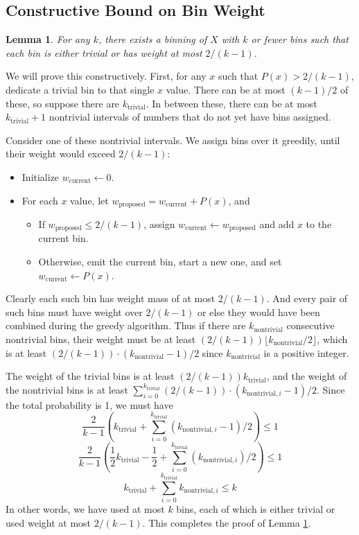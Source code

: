 \documentclass[letterpaper]{article}
\newtheorem{lemma}{Lemma}
\begin{document}
\subsection{Constructive Bound on Bin Weight}

\begin{lemma}
  For any $k$, there exists a binning of $X$ with $k$ or fewer bins such that each bin is either trivial or has weight at most $2/(k - 1)$.
  \label{lemma:binning_construction}
\end{lemma}

We will prove this constructively.
First, for any $x$ such that $P(x) > 2/(k - 1)$, dedicate a trivial bin to that single $x$ value.
There can be at most $(k - 1)/2$ of these, so suppose there are $k_\text{trivial}$.
In between these, there can be at most $k_\text{trivial} + 1$ nontrivial intervals of numbers that do not yet have bins assigned.

Consider one of these nontrivial intervals.
We assign bins over it greedily, until their weight would exceed $2/(k - 1)$:
\begin{itemize}
  \item Initialize $w_\text{current} \gets 0$.
  \item For each $x$ value, let $w_\text{proposed} = w_\text{current} + P(x)$, and
    \begin{itemize}
      \item If $w_\text{proposed} \le 2/(k - 1)$, assign $w_\text{current} \gets w_\text{proposed}$ and add $x$ to the current bin.
      \item Otherwise, emit the current bin, start a new one, and set $w_\text{current} \gets P(x)$.
    \end{itemize}
\end{itemize}
Clearly each such bin has weight mass of at most $2/(k - 1)$.
And every pair of such bins must have weight over $2/(k - 1)$ or else they would have been combined during the greedy algorithm.
Thus if there are $k_\text{nontrivial}$ consecutive nontrivial bins, their weight must be at least $(2/(k - 1)) \lfloor k_\text{nontrivial}/2\rfloor$, which is at least $(2/(k - 1)) \cdot (k_\text{nontrivial} - 1)/2$ since $k_\text{nontrivial}$ is a positive integer.

The weight of the trivial bins is at least $(2/(k - 1)) k_\text{trivial}$, and the weight of the nontrivial bins is at least $\sum_{i=0}^{k_\text{trivial}}(2 / (k - 1)) \cdot (k_{\text{nontrivial}, i} - 1)/2$.
Since the total probability is 1, we must have
\[\frac{2}{k - 1}\left(k_\text{trivial} + \sum_{i=0}^{k_\text{trivial}}(k_{\text{nontrivial}, i} - 1)/2\right) \le 1\]
\[\frac{2}{k - 1}\left(\frac12k_\text{trivial} - \frac12 + \sum_{i=0}^{k_\text{trivial}}(k_{\text{nontrivial}, i})/2\right) \le 1\]
\[k_\text{trivial} + \sum_{i=0}^{k_\text{trivial}}k_{\text{nontrivial}, i} \le k\]
In other words, we have used at most $k$ bins, each of which is either trivial or used weight at most $2/(k-1)$.
This completes the proof of Lemma \ref{lemma:binning_construction}.
\end{document}
